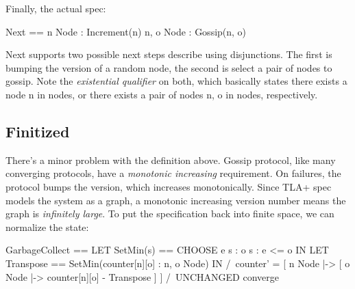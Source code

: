 \documentclass{report}
\begin{document}
Finally, the actual spec: \newline
\begin{tla}
    Next == \/ \E n \in Node : Increment(n)
            \/ \E n, o \in Node : Gossip(n, o)
\end{tla}
\begin{tlatex}
%
\end{tlatex}

Next supports two possible next steps describe using disjunctions. The first is
bumping the version of a random node, the second is select a pair of nodes to
gossip. Note the \textit{existential qualifier} on both, which basically states
there exists a node n in nodes, or there exists a pair of nodes n, o in nodes,
respectively.

\subsection{Finitized}

There's a minor problem with the definition above. Gossip protocol, like many
converging protocols, have a \textit{monotonic increasing} requirement. On
failures, the protocol bumps the version, which increases monotonically. Since
TLA+ spec models the system as a graph, a monotonic increasing version number
means the graph is \textit{infinitely large}. To put the specification back into
finite space, we can normalize the state:\newline

\begin{tla}
GarbageCollect ==
    LET SetMin(s) == CHOOSE e \in s : \A o \in s : e <= o IN
    LET Transpose == SetMin({counter[n][o] : n, o \in Node}) IN
        /\ counter' = [
            n \in Node |-> [
                o \in Node |-> counter[n][o] - Transpose
            ]
          ]
        /\ UNCHANGED converge
\end{tla}
\begin{tlatex}
%
\@x{\@s{36.79} \.{\land} counter \.{'} \.{=} [}%
\@x{\@s{52.01} n \.{\in} Node \.{\mapsto} [}%
\@x{\@s{52.01} ]}%
\@x{\@s{44.99} ]}%
%
\end{tlatex}
\end{document}
